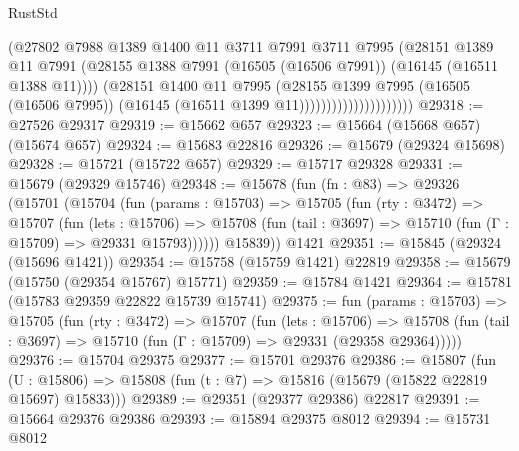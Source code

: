 \begin{lexlean}{RustStd}
\begin{coremodule}
                                    (@27802
                                      @7988
                                      @1389
                                      @1400
                                      @11
                                      @3711
                                      @7991
                                      @3711
                                      @7995
                                      (@28151
                                        @1389
                                        @11
                                        @7991
                                        (@28155
                                          @1388
                                          @7991
                                          (@16505 (@16506 @7991))
                                          (@16145 (@16511 @1388 @11))))
                                      (@28151
                                        @1400
                                        @11
                                        @7995
                                        (@28155
                                          @1399
                                          @7995
                                          (@16505 (@16506 @7995))
                                          (@16145 (@16511 @1399 @11)))))))))))))))))))))
@29318 := @27526 @29317
@29319 := @15662 @657
@29323 := @15664 (@15668 @657) (@15674 @657)
@29324 := @15683 @22816
@29326 := @15679 (@29324 @15698)
@29328 := @15721 (@15722 @657)
@29329 := @15717 @29328
@29331 := @15679 (@29329 @15746)
@29348 := @15678
    (fun (fn : @83) =>
    @29326
      (@15701
        (@15704
          (fun (params : @15703) =>
          @15705
            (fun (rty : @3472) =>
            @15707
              (fun (lets : @15706) =>
              @15708 (fun (tail : @3697) => @15710 (fun (Γ : @15709) => @29331 @15793))))))
        @15839))
    @1421
@29351 := @15845 (@29324 (@15696 @1421))
@29354 := @15758 (@15759 @1421) @22819
@29358 := @15679 (@15750 (@29354 @15767) @15771)
@29359 := @15784 @1421
@29364 := @15781 (@15783 @29359 @22822 @15739 @15741)
@29375 := fun (params : @15703) =>
  @15705
    (fun (rty : @3472) =>
    @15707
      (fun (lets : @15706) =>
      @15708 (fun (tail : @3697) => @15710 (fun (Γ : @15709) => @29331 (@29358 @29364)))))
@29376 := @15704 @29375
@29377 := @15701 @29376
@29386 := @15807
    (fun (U : @15806) => @15808 (fun (t : @7) => @15816 (@15679 (@15822 @22819 @15697) @15833)))
@29389 := @29351 (@29377 @29386) @22817
@29391 := @15664 @29376 @29386
@29393 := @15894 @29375 @8012
@29394 := @15731 @8012

\end{coremodule}
\end{lexlean}
